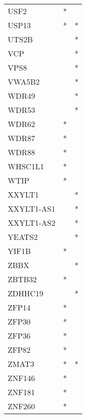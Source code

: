 \begin{longtable}{lcc}
USF2             &              * &            \\
USP13            &              * &          * \\
UTS2B            &                &          * \\
VCP              &                &          * \\
VPS8             &                &          * \\
VWA5B2           &                &          * \\
WDR49            &                &          * \\
WDR53            &                &          * \\
WDR62            &              * &            \\
WDR87            &              * &            \\
WDR88            &              * &            \\
WHSC1L1          &              * &            \\
WTIP             &              * &            \\
XXYLT1           &                &          * \\
XXYLT1-AS1       &                &          * \\
XXYLT1-AS2       &                &          * \\
YEATS2           &                &          * \\
YIF1B            &              * &            \\
ZBBX             &                &          * \\
ZBTB32           &              * &            \\
ZDHHC19          &                &          * \\
ZFP14            &              * &            \\
ZFP30            &              * &            \\
ZFP36            &              * &            \\
ZFP82            &              * &            \\
ZMAT3            &              * &          * \\
ZNF146           &              * &            \\
ZNF181           &              * &            \\
ZNF260           &              * &            \\

\end{longtable}
